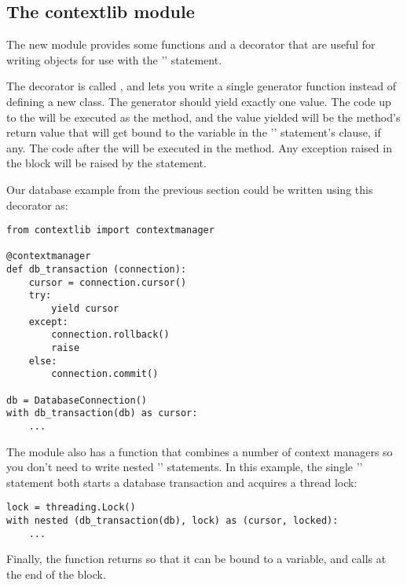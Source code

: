 \documentclass{howto}
\begin{document}
\subsection{The contextlib module\label{module-contextlib}}

The new  module provides some functions and a
decorator that are useful for writing objects for use with the
'' statement.

The decorator is called , and lets you write
a single generator function instead of defining a new class.  The generator
should yield exactly one value.  The code up to the 
will be executed as the  method, and the value
yielded will be the method's return value that will get bound to the
variable in the '' statement's  clause, if
any.  The code after the  will be executed in the
 method.  Any exception raised in the block will be
raised by the  statement.

Our database example from the previous section could be written 
using this decorator as:

\begin{verbatim}
from contextlib import contextmanager

@contextmanager
def db_transaction (connection):
    cursor = connection.cursor()
    try:
        yield cursor
    except:
        connection.rollback()
        raise
    else:
        connection.commit()

db = DatabaseConnection()
with db_transaction(db) as cursor:
    ...
\end{verbatim}

The  module also has a  function that combines a number of context managers so you
don't need to write nested '' statements.  In this
example, the single '' statement both starts a database
transaction and acquires a thread lock:

\begin{verbatim}
lock = threading.Lock()
with nested (db_transaction(db), lock) as (cursor, locked):
    ...
\end{verbatim}

Finally, the  function
returns  so that it can be bound to a variable,
and calls  at the end of the block.
\end{document}
